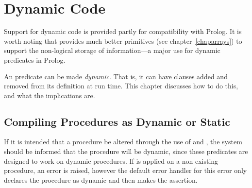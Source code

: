 %
%
%
%
%

\chapter{Dynamic Code}
\label{chapdynamic}

Support for dynamic code is provided partly for compatibility with
Prolog. It is worth noting that \eclipse provides much better primitives (see
chapter~\ref{chaparrays}) to support the non-logical storage of
information---a major use for dynamic  predicates in Prolog.

An {\eclipse} predicate can be made \emph{dynamic}.
That is, it can have clauses added and removed from its definition at run
time.
This chapter discusses how to do this, and what the implications are.

\section{Compiling Procedures as Dynamic or Static}
\label{compdynamic}

If it is intended that
a procedure be altered through the use of
and
,
the system should be informed that the procedure will be dynamic,
since these predicates are
designed to work on dynamic procedures.
If  is applied on a
non-existing procedure, an error
is raised, however the default error handler for this error
only declares the procedure as dynamic and then makes the assertion.

